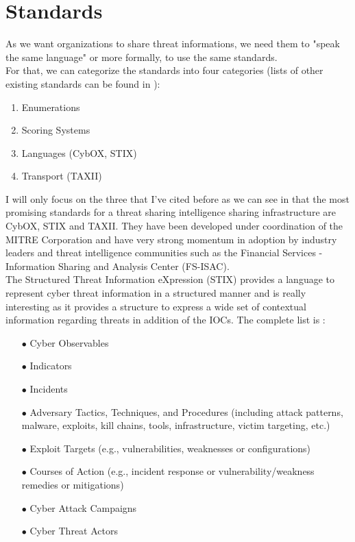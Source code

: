 \documentclass{eplmastersthesis}
\begin{document}
\section{Standards}
As we want organizations to share threat informations, we need them to "speak the same language" or more formally, to use the same standards.\\
For that, we can categorize the standards into four categories (lists of other existing standards can be found in \cite{AwesomeTreat, mohaisen2017rethinking}):
\begin{enumerate}
\item Enumerations
\item Scoring Systems
\item Languages (CybOX, STIX)
\item Transport (TAXII)
\end{enumerate}

I will only focus on the three that I've cited before as we can see in \cite{fransen2015cyber, sauerwein2017threat} that the most promising standards for a threat sharing intelligence sharing infrastructure are CybOX, STIX and TAXII. They have been developed under coordination of the MITRE Corporation and have very strong momentum in adoption by industry leaders and threat intelligence communities such as the Financial Services - Information Sharing and Analysis Center (FS-ISAC).\\
The  Structured Threat Information eXpression (STIX) \cite{barnum2012standardizing} provides a language to represent cyber threat information in a structured manner and is really interesting as it provides a structure to express a wide set of contextual information regarding threats in addition of the IOCs. The complete list is :

\begin{itemize}
\item[$\bullet$] Cyber Observables
\item[$\bullet$] Indicators
\item[$\bullet$] Incidents
\item[$\bullet$] Adversary Tactics, Techniques, and Procedures (including attack patterns, malware, exploits, kill
chains, tools, infrastructure, victim targeting, etc.)
\item[$\bullet$] Exploit Targets (e.g., vulnerabilities, weaknesses or configurations)
\item[$\bullet$] Courses of Action (e.g., incident response or vulnerability/weakness remedies or mitigations)
\item[$\bullet$] Cyber Attack Campaigns
\item[$\bullet$] Cyber Threat Actors
\end{itemize}
\end{document}
